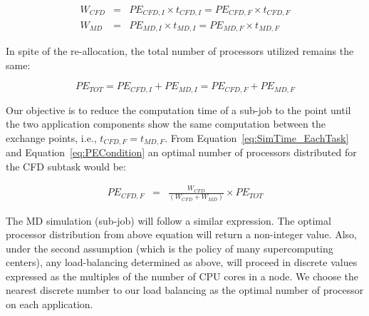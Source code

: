 \documentclass[conference,final]{IEEEtran}
\newcommand{\jhanote}[1]{ {\textcolor{red} { ***Jha: #1 }}}
\newcommand{\jhanote}[1]{}
\begin{document}
\vspace{-.2em}
\footnotesize
\begin{eqnarray}
W_{CFD}&=&PE_{CFD,I}\times t_{CFD,I}=PE_{CFD,F}\times t_{CFD,F} \nonumber \\
W_{MD}&=&PE_{MD,I}\times t_{MD,I}=PE_{MD,F}\times t_{MD,F}
\label{eq:SimTime_EachTask}
\end{eqnarray}
\normalsize

In spite of the re-allocation, the total number of processors utilized
remains the same:

\vspace{-.2em}
\footnotesize
\begin{equation}
PE_{TOT}=PE_{CFD,I}+PE_{MD,I}=PE_{CFD,F}+PE_{MD,F}
\label{eq:PECondition}
\end{equation}
\normalsize

Our objective is to reduce the computation time of a sub-job to the point until the
two application components show the same computation between the
exchange points, i.e., $t_{CFD,F} = t_{MD,F}$. From
Equation~\ref{eq:SimTime_EachTask} and Equation~\ref{eq:PECondition}
an optimal number of processors distributed for the CFD subtask would be:

\vspace{-.2em}
\footnotesize
\begin{eqnarray}
PE_{CFD,F} & = & \frac {W_{CFD}} {(W_{CFD} + W_{MD})} \times PE_{TOT}
\end{eqnarray}
\normalsize

The MD simulation (sub-job) will follow a similar expression.  The
optimal processor distribution from above equation will return a
non-integer value. Also, under the second assumption (which is the
policy of many supercomputing centers), any load-balancing determined
as above, will proceed in discrete values
expressed as the multiples of the number of CPU cores in a node. We choose the nearest discrete number to our load balancing as the optimal number of processor on each application.

\end{document}
